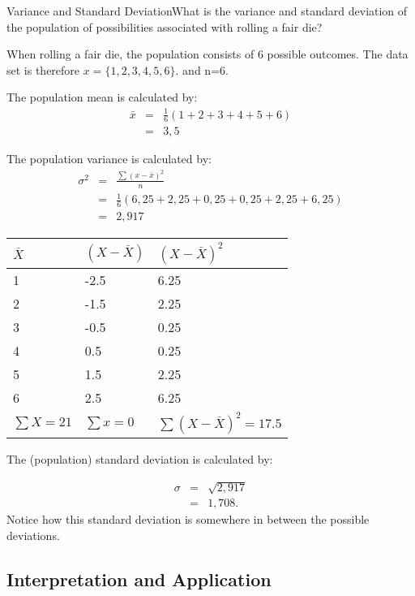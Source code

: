 \begin{wex}{Variance and Standard Deviation}{What is the variance and standard deviation of the population of possibilities associated with rolling a fair die?}
{
When rolling a fair die, the population consists of 6 possible outcomes. The data set is therefore $x=\{1,2,3,4,5,6\}$. and n=6.

The population mean is calculated by:
\begin{eqnarray*}
\bar{x} &=& \frac{1}{6}(1+2+3+4+5+6)\\
&=& 3,5
\end{eqnarray*}

The population variance is calculated by:
\begin{eqnarray*}
\sigma^2&=& \frac{\sum(x-\bar{x})^2}{n}\\
&=&\frac{1}{6} (6,25+2,25+0,25+0,25+2,25+6,25)\\
&=& 2,917
\end{eqnarray*}

\begin{center}
\begin{tabular}{|l|l|l|}
\hline
$\bar{X}$ & $(X - \bar{X})$ & $(X - \bar{X})^2$  \\
\hline
1 & -2.5 & 6.25 \\
2 & -1.5 & 2.25 \\
3 & -0.5 & 0.25 \\
4 & 0.5  & 0.25 \\
5 & 1.5  & 2.25 \\
6 & 2.5  & 6.25 \\
\hline
$\sum{X} = 21$ & $\sum{x} = 0$ & $\sum{(X  - \bar{X})^2} = 17.5$ \\
\hline
\end{tabular}
\end{center}

The (population) standard deviation is calculated by:

\begin{eqnarray*}
\sigma &=& \sqrt{2,917} \\
&=& 1,708.
\end{eqnarray*}
Notice how this standard deviation is somewhere in between the possible deviations.}
\end{wex}

\subsection{Interpretation and Application}

